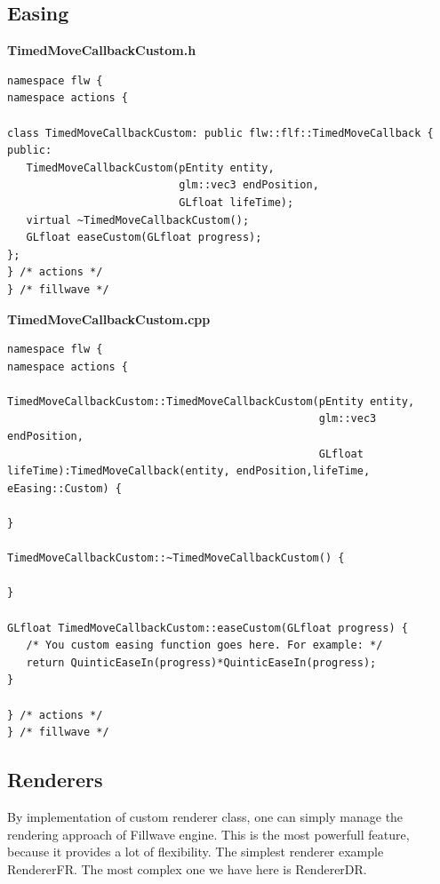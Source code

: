 \documentclass{article}
\begin{document}
\subsection{Easing}\label{sec:Custom easing}
\textbf{TimedMoveCallbackCustom.h}
\begin{lstlisting}
namespace flw {
namespace actions {

class TimedMoveCallbackCustom: public flw::flf::TimedMoveCallback {
public:
   TimedMoveCallbackCustom(pEntity entity,
                           glm::vec3 endPosition,
                           GLfloat lifeTime);
   virtual ~TimedMoveCallbackCustom();
   GLfloat easeCustom(GLfloat progress);
};
} /* actions */
} /* fillwave */
\end{lstlisting}
\textbf{TimedMoveCallbackCustom.cpp}
\begin{lstlisting}
namespace flw {
namespace actions {

TimedMoveCallbackCustom::TimedMoveCallbackCustom(pEntity entity,
                                                 glm::vec3 endPosition,
                                                 GLfloat lifeTime):TimedMoveCallback(entity, endPosition,lifeTime, eEasing::Custom) {

}

TimedMoveCallbackCustom::~TimedMoveCallbackCustom() {

}

GLfloat TimedMoveCallbackCustom::easeCustom(GLfloat progress) {
   /* You custom easing function goes here. For example: */
   return QuinticEaseIn(progress)*QuinticEaseIn(progress);
}

} /* actions */
} /* fillwave */
\end{lstlisting}

\subsection{Renderers}\label{sec:Custom renderers}
\indent By implementation of custom renderer class, one can simply manage the rendering approach of Fillwave engine. This is the most powerfull feature, because it provides a lot of flexibility. The simplest renderer example RendererFR. The most complex one we have here is RendererDR. 
\end{document}
